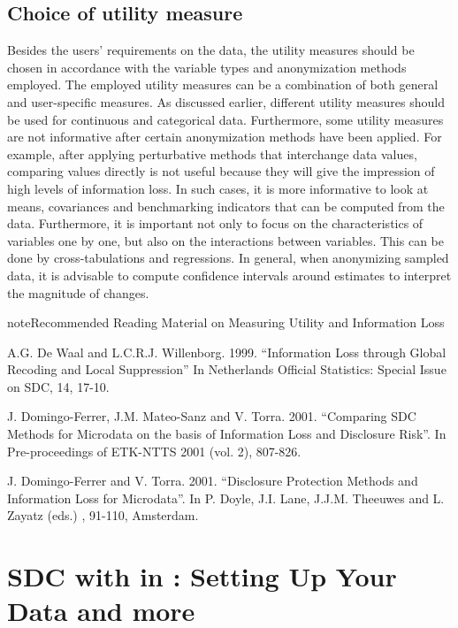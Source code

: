 \documentclass[letterpaper,10pt,english]{sphinxmanual}
\begin{document}
\section{Choice of utility measure}
\label{\detokenize{utility:choice-of-utility-measure}}
Besides the users’ requirements on the data, the utility measures should
be chosen in accordance with the variable types and anonymization
methods employed. The employed utility measures can be a combination of
both general and user-specific measures. As discussed earlier, different
utility measures should be used for continuous and categorical data.
Furthermore, some utility measures are not informative after certain
anonymization methods have been applied. For example, after applying
perturbative methods that interchange data values, comparing values
directly is not useful because they will give the impression of high
levels of information loss. In such cases, it is more informative to
look at means, covariances and benchmarking indicators that can be
computed from the data. Furthermore, it is important not only to focus
on the characteristics of variables one by one, but also on the
interactions between variables. This can be done by cross-tabulations
and regressions. In general, when anonymizing sampled data, it is
advisable to compute confidence intervals around estimates to interpret
the magnitude of changes.

\begin{sphinxadmonition}{note}{Recommended Reading Material on Measuring Utility and Information Loss}

A.G. De Waal and L.C.R.J. Willenborg. 1999. “Information Loss through
Global Recoding and Local Suppression” In Netherlands Official
Statistics: Special Issue on SDC, 14, 17-10.

J. Domingo-Ferrer, J.M. Mateo-Sanz and V. Torra. 2001. “Comparing SDC
Methods for Microdata on the basis of Information Loss and Disclosure
Risk”. In Pre-proceedings of ETK-NTTS 2001 (vol. 2), 807-826.

J. Domingo-Ferrer and V. Torra. 2001. “Disclosure Protection Methods and
Information Loss for Microdata”. In P. Doyle, J.I. Lane, J.J.M. Theeuwes
and L. Zayatz (eds.) , 91-110, Amsterdam.
\end{sphinxadmonition}


\chapter{SDC with  in : Setting Up Your Data and more}
\label{\detokenize{sdcMicro::doc}}\label{\detokenize{sdcMicro:sdc-with-sdcmicro-in-r-setting-up-your-data-and-more}}
\end{document}
